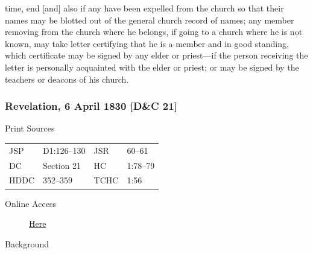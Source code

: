 time, end [and] also if any have been expelled from the church so that their names may be blotted out of the general church record of names; any member removing from the church where he belongs, if going to a church where he is not known, may take letter certifying that he is a member and in good standing, which certificate may be signed by any elder or priest---if the person receiving the letter is personally acquainted with the elder or priest; or may be signed by the teachers or deacons of his church.

		\subsubsection{Revelation, 6 April 1830 [D\&C 21]}
			\label{EMS-1830-JS-6-APR-1830}
		
			\begin{description}
				\item[Print Sources]
			\end{description}

				\begin{tabular}{p{0.5in}p{1in}p{0.5in}p{1in}}
				JSP	 	& D1:126--130	& JSR 		& 60--61	 \\
				DC	 	& Section 21	& HC 		& 1:78--79	 \\
				HDDC 	& 352--359		& TCHC 		& 1:56 \\
				\end{tabular}
			
			\begin{description}
				\item[Online Access] \href{https://www.josephsmithpapers.org/paper-summary/revelation-6-april-1830-dc-21/1}{Here}
			\end{description}
			
			\begin{description}
				\item[Background]
			\end{description}
			
			
